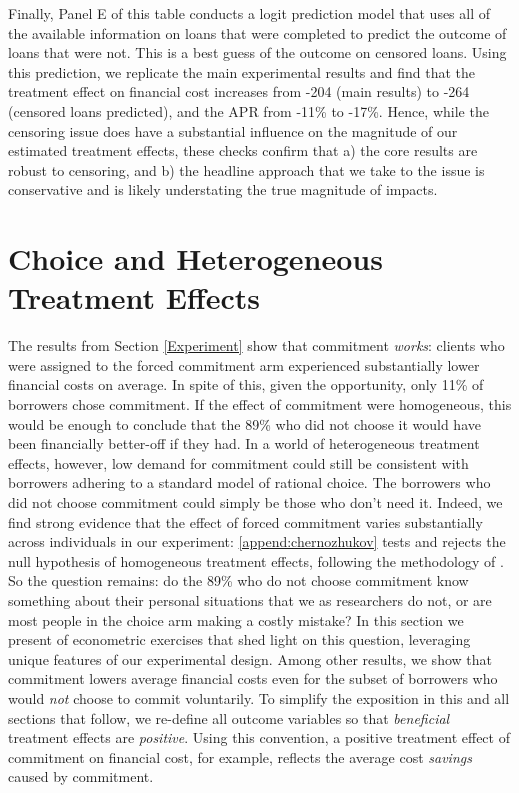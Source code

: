 \documentclass[oneside,11pt]{article}
\begin{document}
Finally, Panel E of this table conducts a logit prediction model that uses all of the available information on loans that were completed to predict the outcome of loans that were not.  This is a best guess of the outcome on censored loans.  Using this prediction, we replicate the main experimental results and find that the treatment effect on financial cost increases from -204 (main results) to -264 (censored loans predicted), and the APR from -11\% to -17\%.  Hence, while the censoring issue does have a substantial influence on the magnitude of our estimated treatment effects, these  checks confirm that a) the core results are robust to censoring, and b) the headline approach that we take to the issue is conservative and is likely understating the true magnitude of impacts.





\section{Choice and Heterogeneous Treatment Effects}
\label{Choice}

The results from Section \ref{Experiment} show that commitment \emph{works}: clients who were assigned to the forced commitment arm experienced substantially lower financial costs on average.
In spite of this, given the opportunity, only 11\% of borrowers chose commitment. 
If the effect of commitment were homogeneous, this would be enough to conclude that the 89\% who did not choose it would have been financially better-off if they had.
In a world of heterogeneous treatment effects, however, low demand for commitment could still be consistent with borrowers adhering to a standard model of rational choice. 
The borrowers who did not choose commitment could simply be those who don't need it. 
Indeed, we find strong evidence that the effect of forced commitment varies substantially across individuals in our experiment: \ref{append:chernozhukov} tests and rejects the null hypothesis of homogeneous treatment effects, following the methodology of \cite{chernozhukov2018generic}.
So the question remains: do the 89\% who do not choose commitment know something about their personal situations that we as researchers do not, or are most people in the choice arm making a costly mistake? 
In this section we present of econometric exercises that shed light on this question, leveraging unique features of our experimental design. 
Among other results, we show that commitment lowers average financial costs even for the subset of borrowers who would \emph{not} choose to commit voluntarily.
To simplify the exposition in this and all sections that follow, we re-define all outcome variables so that \emph{beneficial} treatment effects are \emph{positive}. Using this convention, a positive treatment effect of commitment on financial cost, for example, reflects the average cost \emph{savings} caused by commitment.
\end{document}
